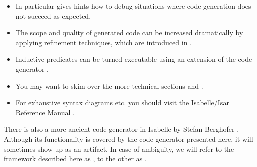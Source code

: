 \begin{isabellebody}
\begin{isamarkuptext}
\begin{itemize}
    \item In particular  gives hints how to
      debug situations where code generation does not succeed as
      expected.

    \item The scope and quality of generated code can be increased
      dramatically by applying refinement techniques, which are
      introduced in .

    \item Inductive predicates can be turned executable using an
      extension of the code generator .

    \item You may want to skim over the more technical sections
       and .

    \item For exhaustive syntax diagrams etc. you should visit the
      Isabelle/Isar Reference Manual \cite{isabelle-isar-ref}.

  \end{itemize}

  \bigskip

  \begin{center}\end{center}

  \begin{warn}
    There is also a more ancient code generator in Isabelle by Stefan
    Berghofer \cite{Berghofer-Nipkow:2002}.  Although its
    functionality is covered by the code generator presented here, it
    will sometimes show up as an artifact.  In case of ambiguity, we
    will refer to the framework described here as , to the other as .
  \end{warn}%
\end{isamarkuptext}%
\isamarkuptrue%
%
\isadelimtheory
%
\endisadelimtheory
%
\isatagtheory
{}\isamarkupfalse%
%
\endisatagtheory
{\isafoldtheory}%
%
\isadelimtheory
%
\endisadelimtheory
\isanewline
\end{isabellebody}%

